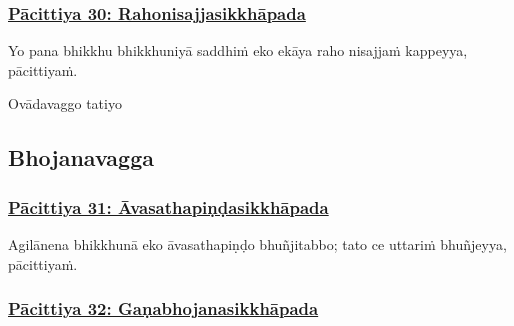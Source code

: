 \subsubsection*{\hyperref[exp30]{Pācittiya 30: Rahonisajjasikkhāpada}}
\label{pac30}

Yo pana bhikkhu bhikkhuniyā saddhiṁ eko ekāya raho nisajjaṁ kappeyya, pācittiyaṁ.

\begin{center}
	Ovādavaggo\makeatletter\hyperlink{endnote279-appendix}\makeatother{} tatiyo
\end{center}



\subsection{Bhojanavagga}
\label{pc-vagga4}

\subsubsection*{\hyperref[exp31]{Pācittiya 31: Āvasathapiṇḍasikkhāpada}}
\label{pac31}

Agilānena\makeatletter\hyperlink{endnote280-appendix}\makeatother{} bhikkhunā eko āvasathapiṇḍo bhuñjitabbo; tato ce uttariṁ\makeatletter\hyperlink{endnote281-appendix}\makeatother{} bhuñjeyya, pācittiyaṁ.



\subsubsection*{\hyperref[exp32]{Pācittiya 32: Gaṇabhojanasikkhāpada}}
\label{pac32}

